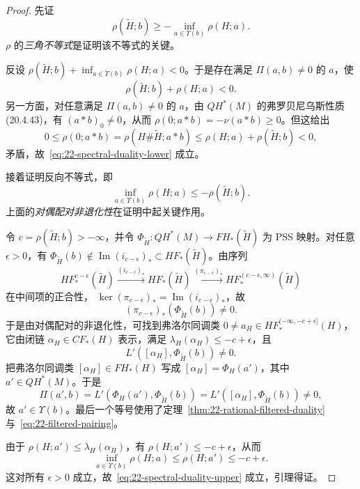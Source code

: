 \begin{proof}
先证
\begin{equation}
 \rho(\widetilde H;b)\geq-\inf_{a\in\Upsilon(b)}\rho(H;a).
 \label{eq:22-spectral-duality-lower}
\end{equation}
$\rho$ 的\emph{三角不等式}是证明该不等式的关键。

反设
$\rho(\widetilde H;b)+\inf_{a\in\Upsilon(b)}\rho(H;a)<0$。于是存在满足
$\Pi(a,b)\neq0$ 的 $a$，使
\[
 \rho(\widetilde H;b)+\rho(H;a)<0.
\]
另一方面，对任意满足 $\Pi(a,b)\neq0$ 的 $a$，由 $QH^*(M)$ 的弗罗贝尼乌斯性质
(20.4.43)，有 $(a*b)_0\neq0$，从而
$\rho(0;a*b)=-\nu(a*b)\geq0$。但这给出
\[
 0\leq\rho(0;a*b)=\rho(H\#\widetilde H;a*b)
 \leq\rho(H;a)+\rho(\widetilde H;b)<0,
\]
矛盾，故~\eqref{eq:22-spectral-duality-lower} 成立。

接着证明反向不等式，即
\begin{equation}
 \inf_{a\in\Upsilon(b)}\rho(H;a)\leq-\rho(\widetilde H;b).
 \label{eq:22-spectral-duality-upper}
\end{equation}
上面的\emph{对偶配对非退化性}在证明中起关键作用。

令 $c=\rho(\widetilde H;b)>-\infty$，并令
$\Phi_{\widetilde H}:QH^*(M)\to FH_*(\widetilde H)$ 为 PSS 映射。对任意
$\epsilon>0$，有
$\Phi_{\widetilde H}(b)\notin\operatorname{Im}(i_{c-\epsilon})_*
\subset HF_*(\widetilde H)$。由序列
\[
 HF_*^{c-\epsilon}(\widetilde H)
 \xrightarrow{(i_{c-\epsilon})_*}HF_*(\widetilde H)
 \xrightarrow{(\pi_{c-\epsilon})_*}HF_*^{(c-\epsilon,\infty)}(\widetilde H)
\]
在中间项的正合性，
$\ker(\pi_{c-\epsilon})_*=\operatorname{Im}(i_{c-\epsilon})_*$，故
\[
 (\pi_{c-\epsilon})_*(\Phi_{\widetilde H}(b))\neq0.
\]
于是由对偶配对的非退化性，可找到弗洛尔同调类
$0\neq a_H\in HF_*^{(-\infty,-c+\epsilon]}(H)$，它由闭链
$\alpha_H\in CF_*(H)$ 表示，满足 $\lambda_H(\alpha_H)\leq-c+\epsilon$，且
\[
 L'([\alpha_H],\Phi_{\widetilde H}(b))\neq0.
\]
把弗洛尔同调类 $[\alpha_H]\in FH_*(H)$ 写成
$[\alpha_H]=\Phi_H(a')$，其中 $a'\in QH^*(M)$。于是
\[
 \Pi(a',b)=L'(\Phi_H(a'),\Phi_{\widetilde H}(b))
 =L'([\alpha_H],\Phi_{\widetilde H}(b))\neq0,
\]
故 $a'\in\Upsilon(b)$。最后一个等号使用了定理~\ref{thm:22-rational-filtered-duality}
与~\eqref{eq:22-filtered-pairing}。

由于 $\rho(H;a')\leq\lambda_H(\alpha_H)$，有
$\rho(H;a')\leq-c+\epsilon$，从而
\[
 \inf_{a\in\Upsilon(b)}\rho(H;a)\leq\rho(H;a')\leq-c+\epsilon.
\]
这对所有 $\epsilon>0$ 成立，故~\eqref{eq:22-spectral-duality-upper} 成立，引理得证。
\end{proof}

